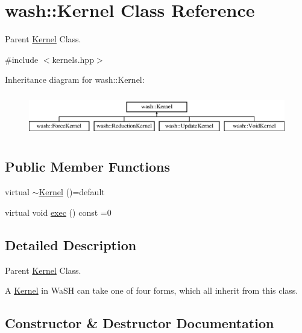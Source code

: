 \hypertarget{classwash_1_1Kernel}{}\section{wash\+:\+:Kernel Class Reference}
\label{classwash_1_1Kernel}


Parent \mbox{\hyperlink{classwash_1_1Kernel}{Kernel}} Class.  




{\ttfamily \#include $<$kernels.\+hpp$>$}

Inheritance diagram for wash\+:\+:Kernel\+:\begin{figure}[H]
\begin{center}
\leavevmode
\includegraphics[height=1.891892cm]{classwash_1_1Kernel}
\end{center}
\end{figure}
\subsection*{Public Member Functions}
\begin{DoxyCompactItemize}
\item 
virtual \mbox{\hyperlink{classwash_1_1Kernel_a614fe73b6b39ee48838eedcb2d9e42b5}{$\sim$\+Kernel}} ()=default
\item 
virtual void \mbox{\hyperlink{classwash_1_1Kernel_a0ec211840402ce975997b22136f16e39}{exec}} () const =0
\end{DoxyCompactItemize}


\subsection{Detailed Description}
Parent \mbox{\hyperlink{classwash_1_1Kernel}{Kernel}} Class. 

A \mbox{\hyperlink{classwash_1_1Kernel}{Kernel}} in Wa\+SH can take one of four forms, which all inherit from this class. 

\subsection{Constructor \& Destructor Documentation}
\mbox{\label{classwash_1_1Kernel_a614fe73b6b39ee48838eedcb2d9e42b5}} 
